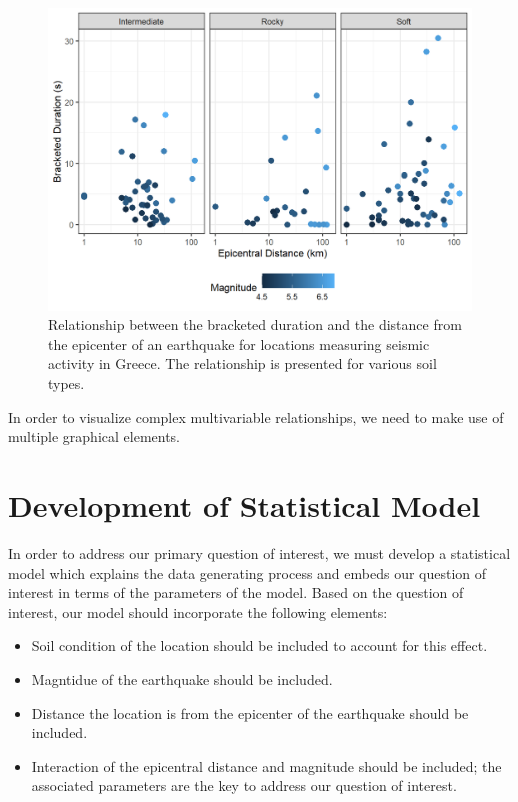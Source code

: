 \documentclass[
]{book}
\providecommand{\tightlist}{%
  \setlength{\itemsep}{0pt}\setlength{\parskip}{0pt}}
\theoremstyle{plain}
\theoremstyle{mydefn}
\theoremstyle{myexmpl}
\theoremstyle{remark}
\begin{document}
\begin{figure}

{\centering \includegraphics[width=0.8\linewidth]{./Images/regrecap-plot-1} 

}

\caption{Relationship between the bracketed duration and the distance from the epicenter of an earthquake for locations measuring seismic activity in Greece.  The relationship is presented for various soil types.}\label{fig:regrecap-plot}
\end{figure}

In order to visualize complex multivariable relationships, we need to make use of multiple graphical elements.

\hypertarget{development-of-statistical-model}{%
\section{Development of Statistical Model}\label{development-of-statistical-model}}

In order to address our primary question of interest, we must develop a statistical model which explains the data generating process and embeds our question of interest in terms of the parameters of the model. Based on the question of interest, our model should incorporate the following elements:

\begin{itemize}
\tightlist
\item
  Soil condition of the location should be included to account for this effect.
\item
  Magntidue of the earthquake should be included.
\item
  Distance the location is from the epicenter of the earthquake should be included.
\item
  Interaction of the epicentral distance and magnitude should be included; the associated parameters are the key to address our question of interest.
\end{itemize}
\end{document}
